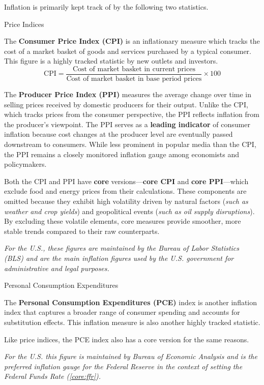 \documentclass[10pt]{article}
\begin{document}
    Inflation is primarily kept track of by the following two statistics.

    \begin{core}{Price Indices}

      The \textbf{Consumer Price Index (CPI)} is an inflationary measure which tracks the cost of a market basket of goods and services purchased by a typical consumer. This figure is a highly tracked statistic by new outlets and investors.
      \[
        \text{CPI} = \frac{\text{Cost of market basket in current prices}}{\text{Cost of market basket in base period prices}} \times 100
      \]

      The \textbf{Producer Price Index (PPI)} measures the average change over time in selling prices received by domestic producers for their output. Unlike the CPI, which tracks prices from the consumer perspective, the PPI reflects inflation from the producer's viewpoint. The PPI serves as a \textbf{leading indicator} of consumer inflation because cost changes at the producer level are eventually passed downstream to consumers. While less prominent in popular media than the CPI, the PPI remains a closely monitored inflation gauge among economists and policymakers.

      Both the CPI and PPI have \textbf{core} versions---\textbf{core CPI} and \textbf{core PPI}---which exclude food and energy prices from their calculations. These components are omitted because they exhibit high volatility driven by natural factors (\textit{such as weather and crop yields}) and geopolitical events (\textit{such as oil supply disruptions}). By excluding these volatile elements, core measures provide smoother, more stable trends compared to their raw counterparts.

      \textit{For the U.S., these figures are maintained by the Bureau of Labor Statistics (BLS) and are the main inflation figures used by the U.S. government for administrative and legal purposes.}

    \end{core}

    \begin{core}{Personal Consumption Expenditures}

      The \textbf{Personal Consumption Expenditures (PCE)} index is another inflation index that captures a broader range of consumer spending and accounts for substitution effects. This inflation measure is also another highly tracked statistic.

      Like price indices, the PCE index also has a core version for the same reasons.

      \textit{For the U.S. this figure is maintained by Bureau of Economic Analysis and is the preferred inflation gauge for the Federal Reserve in the context of setting the Federal Funds Rate (\textit{\autoref{core:ffr}}).}

    \end{core}
\end{document}
